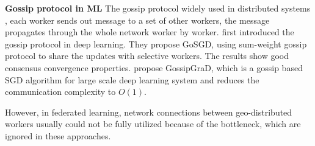 
\textbf{Gossip protocol in ML}
The gossip protocol widely used in distributed systems \cite{baraglia2013a,haas2002gossip-based}, each worker sends out message to a set of other workers, the message propagates through the whole network worker by worker. \cite{blot2016gossip} first introduced the gossip protocol in deep learning. They propose GoSGD, using sum-weight gossip protocol to share the updates with selective workers. The results show good consensus convergence properties. \cite{daily2018gossipgrad:} propose GossipGraD, which is a gossip based SGD algorithm for large scale deep learning system and reduces the communication complexity to $O(1)$. 

However, in federated learning, network connections between geo-distributed workers usually could not be fully utilized because of the bottleneck, which are ignored in these approaches. 

%
%



